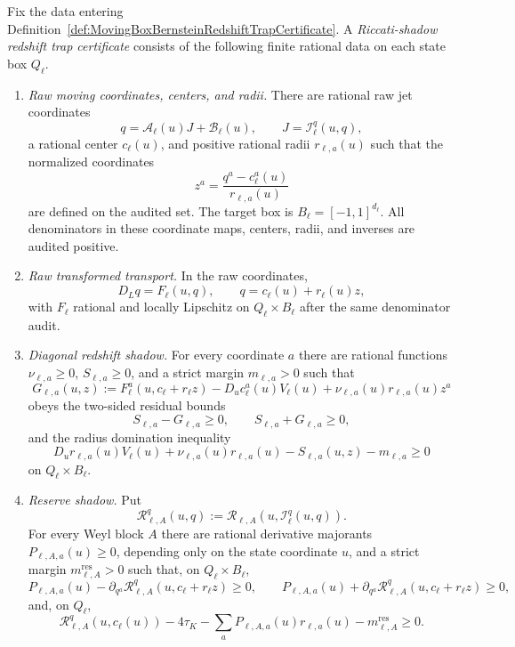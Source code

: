 \begin{definition}\label{def:RiccatiShadowRedshiftTrapCertificate}
Fix the data entering
Definition~\ref{def:MovingBoxBernsteinRedshiftTrapCertificate}.  A
\emph{Riccati-shadow redshift trap certificate} consists of the following
finite rational data on each state box $Q_\ell$.
\begin{enumerate}
    \item \emph{Raw moving coordinates, centers, and radii.}  There are
    rational raw jet coordinates
    \[
        q=\mathcal A_\ell(u)J+\mathcal B_\ell(u),
        \qquad
        J=\mathcal I_\ell^q(u,q),
    \]
    a rational center $c_\ell(u)$, and positive rational radii
    $r_{\ell,a}(u)$ such that the normalized coordinates
    \[
        z^a=\frac{q^a-c_\ell^a(u)}{r_{\ell,a}(u)}
    \]
    are defined on the audited set.  The target box is
    $B_\ell=[-1,1]^{d_\ell}$.  All denominators in these coordinate maps,
    centers, radii, and inverses are audited positive.

    \item \emph{Raw transformed transport.}  In the raw coordinates,
    \[
        D_Lq=F_\ell(u,q),
        \qquad q=c_\ell(u)+r_\ell(u)z,
    \]
    with $F_\ell$ rational and locally Lipschitz on
    $Q_\ell\times B_\ell$ after the same denominator audit.

    \item \emph{Diagonal redshift shadow.}  For every coordinate $a$ there are
    rational functions
    $\nu_{\ell,a}\ge0$, $S_{\ell,a}\ge0$, and a strict margin
    $m_{\ell,a}>0$ such that
    \[
        G_{\ell,a}(u,z)
        :=
        F_\ell^a(u,c_\ell+r_\ell z)
        -D_uc_\ell^a(u)V_\ell(u)
        +\nu_{\ell,a}(u)r_{\ell,a}(u)z^a
    \]
    obeys the two-sided residual bounds
    \[
        S_{\ell,a}-G_{\ell,a}\ge0,
        \qquad
        S_{\ell,a}+G_{\ell,a}\ge0,
    \]
    and the radius domination inequality
    \[
        D_ur_{\ell,a}(u)V_\ell(u)
        +\nu_{\ell,a}(u)r_{\ell,a}(u)
        -S_{\ell,a}(u,z)-m_{\ell,a}\ge0
    \]
    on $Q_\ell\times B_\ell$.

    \item \emph{Reserve shadow.}  Put
    \[
        \mathcal R_{\ell,A}^q(u,q)
        :=
        \mathcal R_{\ell,A}(u,\mathcal I_\ell^q(u,q)).
    \]
    For every Weyl block $A$ there are rational derivative majorants
    $P_{\ell,A,a}(u)\ge0$, depending only on the state coordinate $u$, and a
    strict margin $m_{\ell,A}^{\mathrm{res}}>0$
    such that, on $Q_\ell\times B_\ell$,
    \[
        P_{\ell,A,a}(u)
        -\partial_{q^a}\mathcal R_{\ell,A}^q(u,c_\ell+r_\ell z)\ge0,
        \qquad
        P_{\ell,A,a}(u)
        +\partial_{q^a}\mathcal R_{\ell,A}^q(u,c_\ell+r_\ell z)\ge0,
    \]
    and, on $Q_\ell$,
    \[
        \mathcal R_{\ell,A}^q(u,c_\ell(u))-4\tau_K
        -\sum_a P_{\ell,A,a}(u)r_{\ell,a}(u)
        -m_{\ell,A}^{\mathrm{res}}\ge0 .
    \]


\end{enumerate}
\end{definition}
